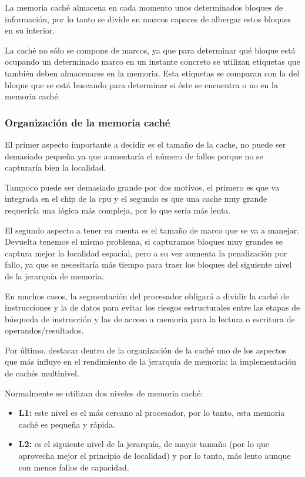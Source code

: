 La memoria caché almacena en cada momento unos determinados bloques de información, por lo tanto se divide en marcos capaces de albergar estos bloques en su interior.

La caché no sólo se compone de marcos, ya que para determinar qué bloque está ocupando un determinado marco en un instante concreto se utilizan etiquetas que también deben almacenarse en la memoria. Esta etiquetas se comparan con la del bloque que se está buscando para determinar si éste se encuentra o no en la memoria caché.

\subsubsection*{Organización de la memoria caché}

El primer aspecto importante a decidir es el tamaño de la cache, no puede ser demasiado pequeña ya que aumentaría el número de fallos porque no se capturaría bien la localidad. 

Tampoco puede ser demasiado grande por dos motivos, el primero es que va integrada en el chip de la cpu y el segundo es que una cache muy grande requeriría una lógica más compleja, por lo que sería más lenta.

El segundo aspecto a tener en cuenta es el tamaño de marco que se va a manejar. Devuelta tenemos el mismo problema, si capturamos bloques muy grandes se captura mejor la localidad espacial, pero a su vez aumenta la penalización por fallo, ya que se necesitaría más tiempo para traer los bloques del siguiente nivel de la jerarquía de memoria.

En muchos casos, la segmentación del procesador obligará a dividir la caché de instrucciones y la de datos para evitar los riesgos estructurales entre las etapas de búsqueda de instrucción y las de acceso a memoria para la lectura o escritura de operandos/resultados.

Por último, destacar dentro de la organización de la caché uno de los aspectos que más influye en el rendimiento de la jerarquía de memoria: la implementación de cachés multinivel.

Normalmente se utilizan dos niveles de memoria caché:

\begin{itemize}
  \item \textbf{L1:} este nivel es el más cercano al procesador, por lo tanto, esta memoria caché es pequeña y rápida.
  \item \textbf{L2:} es el siguiente nivel de la jerarquía, de mayor tamaño (por lo que aprovecha mejor el principio de localidad) y por lo tanto, más lento aunque con menos fallos de capacidad.
\end{itemize}

